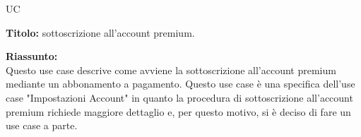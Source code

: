 \begin{listaPersonale}{UC}
    \begin{listaPersonale2}[UC] {}
        \newpage

        \begin{center}
            
        \end{center}


        \textbf{Titolo:} sottoscrizione all'account premium.

        \textbf{Riassunto:} \\
        Questo use case descrive come avviene la sottoscrizione all'account premium mediante un abbonamento a pagamento.
        Questo use case è una specifica dell'use case "Impostazioni Account" in quanto la procedura di sottoscrizione all'account premium richiede maggiore dettaglio e, per questo motivo, si è deciso di fare un use case a parte.


\end{listaPersonale2}
\end{listaPersonale}
